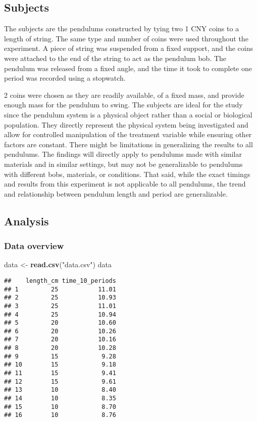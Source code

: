 \documentclass[
]{article}
\newenvironment{Shaded}{\begin{snugshade}}{\end{snugshade}}
\newcommand{\FunctionTok}[1]{\textcolor[rgb]{0.13,0.29,0.53}{\textbf{#1}}}
\newcommand{\NormalTok}[1]{#1}
\newcommand{\OtherTok}[1]{\textcolor[rgb]{0.56,0.35,0.01}{#1}}
\newcommand{\StringTok}[1]{\textcolor[rgb]{0.31,0.60,0.02}{#1}}
\begin{document}
\subsection{Subjects}\label{subjects}

The subjects are the pendulums constructed by tying two 1 CNY coins to a
length of string. The same type and number of coins were used throughout
the experiment. A piece of string was suspended from a fixed support,
and the coins were attached to the end of the string to act as the
pendulum bob. The pendulum was released from a fixed angle, and the time
it took to complete one period was recorded using a stopwatch.

2 coins were chosen as they are readily available, of a fixed mass, and
provide enough mass for the pendulum to swing. The subjects are ideal
for the study since the pendulum system is a physical object rather than
a social or biological population. They directly represent the physical
system being investigated and allow for controlled manipulation of the
treatment variable while ensuring other factors are constant. There
might be limitations in generalizing the results to all pendulums. The
findings will directly apply to pendulums made with similar materials
and in similar settings, but may not be generalizable to pendulums with
different bobs, materials, or conditions. That said, while the exact
timings and results from this experiment is not applicable to all
pendulums, the trend and relationship between pendulum length and period
are generalizable.

\subsection{Analysis}\label{analysis}

\subsubsection{Data overview}\label{data-overview}

\begin{Shaded}
\begin{Highlighting}[]
\NormalTok{data }\OtherTok{\textless{}{-}} \FunctionTok{read.csv}\NormalTok{(}\StringTok{"data.csv"}\NormalTok{)}
\NormalTok{data}
\end{Highlighting}
\end{Shaded}

\begin{verbatim}
##    length_cm time_10_periods
## 1         25           11.01
## 2         25           10.93
## 3         25           11.01
## 4         25           10.94
## 5         20           10.60
## 6         20           10.26
## 7         20           10.16
## 8         20           10.28
## 9         15            9.28
## 10        15            9.18
## 11        15            9.41
## 12        15            9.61
## 13        10            8.40
## 14        10            8.35
## 15        10            8.70
## 16        10            8.76
\end{verbatim}
\end{document}
